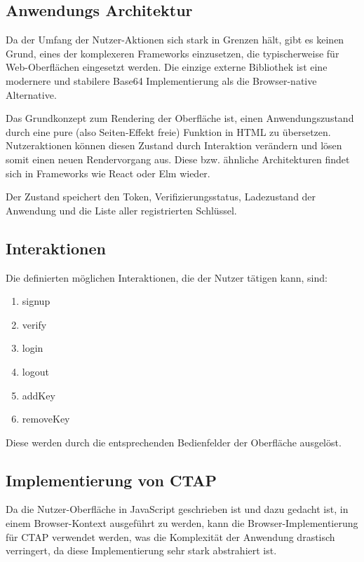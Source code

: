 \documentclass[journal]{IEEEtran}
\begin{document}
\subsection{Anwendungs Architektur}

Da der Umfang der Nutzer-Aktionen sich stark in Grenzen hält, gibt es keinen
Grund, eines der komplexeren Frameworks einzusetzen, die typischerweise für
Web-Oberflächen eingesetzt werden. Die einzige externe Bibliothek ist eine
modernere und stabilere Base64 Implementierung als die Browser-native
Alternative.

Das Grundkonzept zum Rendering der Oberfläche ist, einen Anwendungszustand
durch eine pure (also Seiten-Effekt freie) Funktion in HTML zu übersetzen.
Nutzeraktionen können diesen Zustand durch Interaktion verändern und lösen
somit einen neuen Rendervorgang aus. Diese bzw. ähnliche Architekturen findet
sich in Frameworks wie React oder Elm wieder.~\cite{elm}

Der Zustand speichert den Token, Verifizierungsstatus, Ladezustand der
Anwendung und die Liste aller registrierten Schlüssel.

\subsection{Interaktionen}

Die definierten möglichen Interaktionen, die der Nutzer tätigen kann, sind:

\begin{enumerate}
	\item signup
	\item verify
	\item login
	\item logout
	\item addKey
	\item removeKey
\end{enumerate}

Diese werden durch die entsprechenden Bedienfelder der Oberfläche ausgelöst.

\subsection{Implementierung von CTAP}

Da die Nutzer-Oberfläche in JavaScript geschrieben ist und dazu gedacht ist, in
einem Browser-Kontext ausgeführt zu werden, kann die Browser-Implementierung
für CTAP verwendet werden, was die Komplexität der Anwendung drastisch
verringert, da diese Implementierung sehr stark abstrahiert ist.
\end{document}
